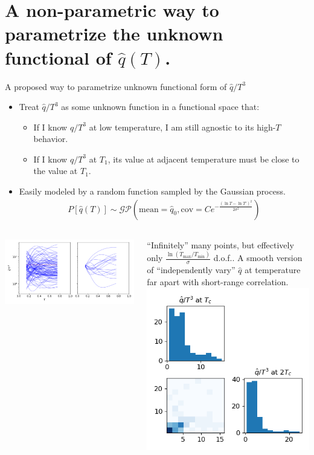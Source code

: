\documentclass[11pt, aspectratio=1610]{beamer}
\begin{document}
\section{A non-parametric way to parametrize the unknown functional of $\hat{q}(T)$.}
\begin{frame}{A proposed way to parametrize unknown functional form of $\hat{q}/T^3$}
\begin{itemize}
\item Treat $\hat{q}/T^3$ as some unknown function in a functional space that:
\begin{itemize}
\item If I know $\hat{q}/T^3$ at low temperature, I am still agnostic to its high-$T$ behavior.
\item If I know $\hat{q}/T^3$ at $T_1$, its value at adjacent temperature must be close to the value at $T_1$.
\end{itemize}
\item Easily modeled by a random function sampled by the Gaussian process.
\begin{eqnarray}
\nonumber
P[\hat{q}(T)] \sim \mathcal{GP}\left(\textrm{mean}=\hat{q}_0, \textrm{cov}=C e^{-\frac{(\ln T-\ln T')^2}{2\sigma^2 } } \right)
\end{eqnarray}
\end{itemize}
\begin{columns}
\begin{column}{.4\textwidth}
\includegraphics[width=\textwidth]{qhat_sample.png}
\end{column}
\begin{column}{.6\textwidth}
``Infinitely'' many points, but effectively only $\frac{\ln(T_{\max}/T_{\min})}{\sigma}$ d.o.f.. A smooth version of ``independently vary'' $\hat{q}$ at temperature far apart with short-range correlation. 
\\
\includegraphics[width=.4\textwidth]{qhat_long.png}

\end{column}
\end{columns}
\end{frame}
\end{document}
